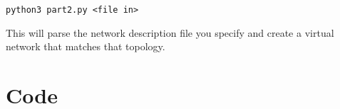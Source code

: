 \documentclass{article}
\begin{document}
	\begin{center}
	\verb|python3 part2.py <file in>|
	\end{center}
	
	This will parse the network description file you specify and create a virtual network that matches that topology.
	
	\pagebreak
	
	\section{Code}
	
	
	
\end{document}
